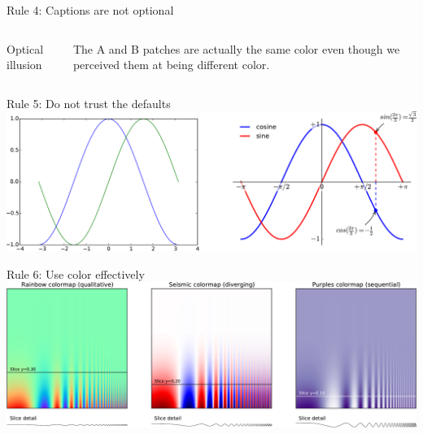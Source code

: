 \documentclass[10pt,aspectratio=169]{beamer}
\begin{document}
\begin{frame}{Rule 4: Captions are not optional}
\begin{columns}
\begin{column}{.45\textwidth}
\begin{center}
        \end{center}
    \end{column}
  \end{columns}
  \begin{columns}
    \begin{column}{.45\textwidth}
        \begin{center}
          Optical illusion
        \end{center}
    \end{column}
    \begin{column}{.45\textwidth}
        \begin{center}
          The A and B patches are actually the same color even
          though we perceived them at being different color.
        \end{center}
    \end{column}
  \end{columns}


\end{frame}

\begin{frame}{Rule 5: Do not trust the defaults}
  \includegraphics[width=\textwidth]{rule-5.pdf}
\end{frame}

\begin{frame}{Rule 6: Use color effectively}
  \includegraphics[width=\textwidth]{rule-6.pdf}
\end{frame}
\end{document}
